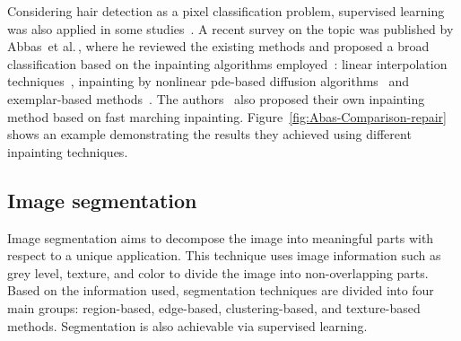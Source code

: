 Considering hair detection as a pixel classification problem, supervised learning was also applied in some studies~\cite{Debeir1999,Wighton2011}.
A recent survey on the topic was published by Abbas~et al.\,\cite{Abbas2011a}, where he reviewed the existing methods and proposed a broad classification based on the inpainting algorithms employed~\cite{korotkov2012computerized}: linear interpolation techniques~\cite{Lee1997,Fleming1998,Schmid-Saugeon2003,Nguyen2010}, inpainting by nonlinear \ac{pde}-based diffusion algorithms~\cite{Chung2000,Barcelos2009,Xie2009,Abbas2010a} and exemplar-based methods~\cite{Zhou2008a,Wighton2008,Abbas2010}. 
The authors~\cite{Abbas2011a,Abbas2012b} also proposed their own inpainting method based on fast marching inpainting. 
Figure~\ref{fig:Abas-Comparison-repair} shows an example demonstrating the results they achieved using different inpainting techniques.

\subsection{Image segmentation} \label{subsec:imgseg}
Image segmentation aims to decompose the image into meaningful parts with respect to a unique application. 
This technique uses image information such as grey level, texture, and color to divide the image into non-overlapping parts. 
Based on the information used, segmentation techniques are divided into four main groups: region-based, edge-based, clustering-based, and texture-based methods. 
Segmentation is also achievable via supervised learning. 

